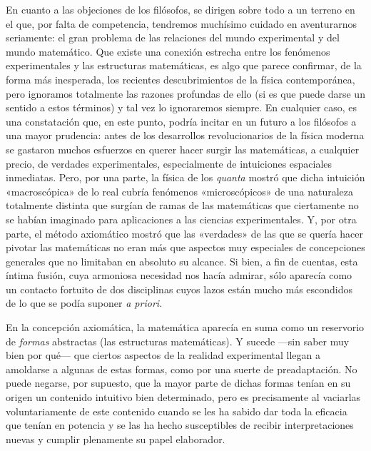 \documentclass[a4paper, 12pt, draft]{article}
\begin{document}
En cuanto a las objeciones de los filósofos, se dirigen sobre todo a un terreno en el que, por falta de competencia, tendremos muchísimo cuidado en aventurarnos seriamente: el gran problema de las relaciones del mundo experimental y del mundo matemático. Que existe una conexión estrecha entre los fenómenos experimentales y las estructuras matemáticas, es algo que parece confirmar, de la forma más inesperada, los recientes descubrimientos de la física contemporánea, pero ignoramos totalmente las razones profundas de ello (si es que puede darse un sentido a estos términos) y tal vez lo ignoraremos siempre. En cualquier caso, es una constatación que, en este punto, podría incitar en un futuro a los filósofos a una mayor prudencia: antes de los desarrollos revolucionarios de la física moderna se gastaron muchos esfuerzos en querer hacer surgir las matemáticas, a cualquier precio, de verdades experimentales, especialmente de intuiciones espaciales inmediatas. Pero, por una parte, la física de los \textit{quanta} mostró que dicha intuición «macroscópica» de lo real cubría fenómenos «microscópicos» de una naturaleza totalmente distinta que surgían de ramas de las matemáticas que ciertamente no se habían imaginado para aplicaciones a las ciencias experimentales. Y, por otra parte, el método axiomático mostró que las «verdades» de las que se quería hacer pivotar las matemáticas no eran más que aspectos muy especiales de concepciones generales que no limitaban en absoluto su alcance. Si bien, a fin de cuentas, esta íntima fusión, cuya armoniosa necesidad nos hacía admirar, sólo aparecía como un contacto fortuito de dos disciplinas cuyos lazos están mucho más escondidos de lo que se podía suponer \textit{a priori.}

En la concepción axiomática, la matemática aparecía en suma como un reservorio de \textit{formas} abstractas (las estructuras matemáticas). Y sucede ---sin saber muy bien por qué--- que ciertos aspectos de la realidad experimental llegan a amoldarse a algunas de estas formas, como por una suerte de preadaptación. No puede negarse, por supuesto, que la mayor parte de dichas formas tenían en su origen un contenido intuitivo bien determinado, pero es precisamente al vaciarlas voluntariamente de este contenido cuando se les ha sabido dar toda la eficacia que tenían en potencia y se las ha hecho susceptibles de recibir interpretaciones nuevas y cumplir plenamente su papel elaborador.
\end{document}
